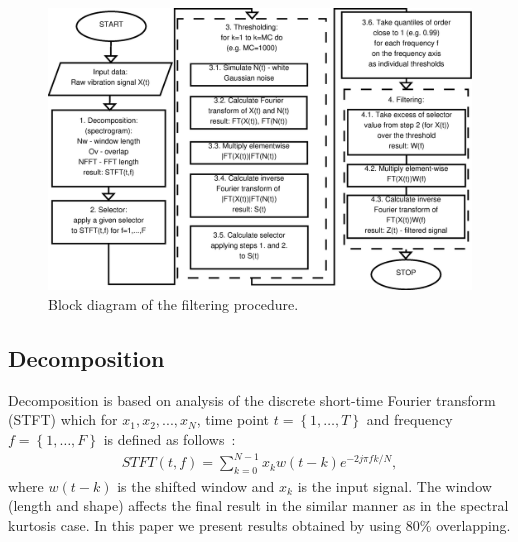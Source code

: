 \begin{figure}[!t]
\centering
\includegraphics[width=1\textwidth]{methodology/filtering/Diagram2}
\caption{Block diagram of the filtering procedure.}
\label{filtering_fig1}
\end{figure}
\subsection{Decomposition}\label{filtering_decomposition}
Decomposition is based on analysis of the discrete short-time Fourier transform (STFT) which for $x_1,x_2,...,x_N$, time point $t= \left\{1,\ldots,T\right\}$ and frequency $f= \left\{1,\ldots,F\right\}$ is defined as follows~\cite{Allen1977235}:
\begin{eqnarray}
STFT(t,f)=\sum_{k=0}^{N-1}x_k w(t-k)e^{-2j\pi f k/N},
\label{filtering_stft-discr}\end{eqnarray}
where $w(t-k)$ is the shifted window and $x_k$ is the input signal. The window (length and shape) affects the final result in the similar manner as in the spectral kurtosis case. In this paper we present results obtained by using 80\% overlapping.
